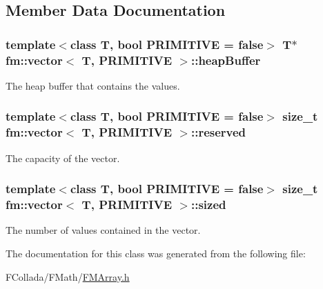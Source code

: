 \subsection{Member Data Documentation}
\hypertarget{classfm_1_1vector_a04d2e3a1f69f87fc9024f4f96a145cb6}{
\subsubsection[{heapBuffer}]{\setlength{\rightskip}{0pt plus 5cm}template$<$class T, bool PRIMITIVE = false$>$ T$\ast$ {\bf fm::vector}$<$ T, PRIMITIVE $>$::{\bf heapBuffer}}}
\label{classfm_1_1vector_a04d2e3a1f69f87fc9024f4f96a145cb6}
The heap buffer that contains the values. \hypertarget{classfm_1_1vector_ac0e612b5f0f159b22f93c9f9bb37b722}{
\subsubsection[{reserved}]{\setlength{\rightskip}{0pt plus 5cm}template$<$class T, bool PRIMITIVE = false$>$ size\_\-t {\bf fm::vector}$<$ T, PRIMITIVE $>$::{\bf reserved}}}
\label{classfm_1_1vector_ac0e612b5f0f159b22f93c9f9bb37b722}
The capacity of the vector. \hypertarget{classfm_1_1vector_af23c511dc075041959151b7bd02a214d}{
\subsubsection[{sized}]{\setlength{\rightskip}{0pt plus 5cm}template$<$class T, bool PRIMITIVE = false$>$ size\_\-t {\bf fm::vector}$<$ T, PRIMITIVE $>$::{\bf sized}}}
\label{classfm_1_1vector_af23c511dc075041959151b7bd02a214d}
The number of values contained in the vector. 

The documentation for this class was generated from the following file:\begin{DoxyCompactItemize}
\item 
FCollada/FMath/\hyperlink{FMArray_8h}{FMArray.h}\end{DoxyCompactItemize}

